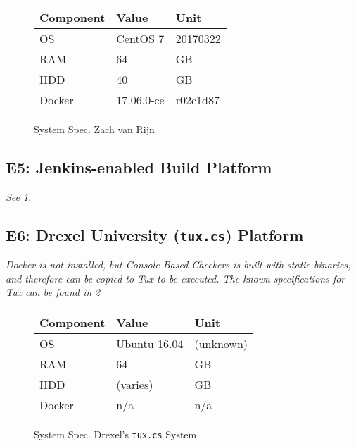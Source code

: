 \documentclass[letterpaper]{article}
\begin{document}
\begin{figure}
\centering
\begin{tabulary}{\linewidth}{LLL}
    Component & Value       & Unit     \\
    \hline
    OS     	  & CentOS 7   & 20170322  \\
    RAM       & 64         & GB        \\
    HDD       & 40         & GB        \\
    Docker    & 17.06.0-ce & r02c1d87  \\
\end{tabulary}
\caption{System Spec. Zach van Rijn}
\label{fig:environment_zachv}
\end{figure}

\subsection{E5: Jenkins-enabled Build Platform}
\label{sec:environment_jenkins}

\emph{See \cref{fig:environment_zachv}}.

\subsection{E6: Drexel University (\texttt{tux.cs}) Platform}
\label{sec:environment_drexel}

\emph{Docker is not installed, but Console-Based Checkers is built with static binaries, and therefore can be copied to Tux to be executed. The known specifications for Tux can be found in \cref{fig:environment_drex}}

\begin{figure}
\centering
\begin{tabulary}{\linewidth}{LLL}
    Component & Value        & Unit      \\
    \hline
    OS     	  & Ubuntu 16.04 & (unknown) \\
    RAM       & 64           & GB        \\
    HDD       & (varies)     & GB        \\
    Docker    & n/a          & n/a       \\
\end{tabulary}
\caption{System Spec. Drexel's \texttt{tux.cs} System}
\label{fig:environment_drex}
\end{figure}

\end{document}
